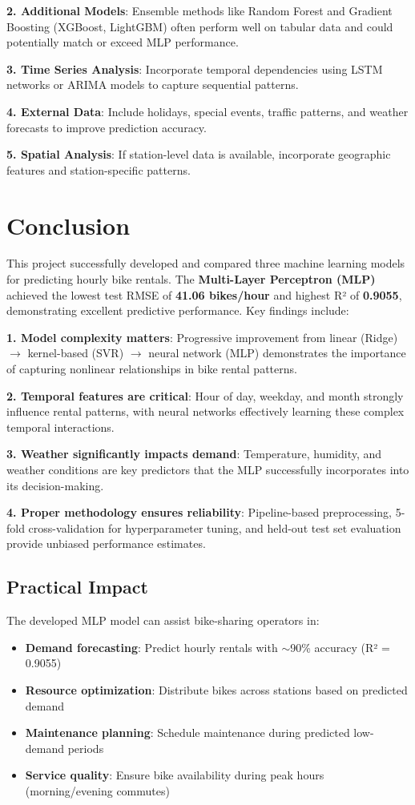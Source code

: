 \documentclass[conference]{IEEEtran}
\begin{document}
\textbf{2. Additional Models}: Ensemble methods like Random Forest and Gradient Boosting (XGBoost, LightGBM) often perform well on tabular data and could potentially match or exceed MLP performance.

\textbf{3. Time Series Analysis}: Incorporate temporal dependencies using LSTM networks or ARIMA models to capture sequential patterns.

\textbf{4. External Data}: Include holidays, special events, traffic patterns, and weather forecasts to improve prediction accuracy.

\textbf{5. Spatial Analysis}: If station-level data is available, incorporate geographic features and station-specific patterns.

\section{Conclusion}
\label{conclusion}

This project successfully developed and compared three machine learning models for predicting hourly bike rentals. The \textbf{Multi-Layer Perceptron (MLP)} achieved the lowest test RMSE of \textbf{41.06 bikes/hour} and highest R² of \textbf{0.9055}, demonstrating excellent predictive performance. Key findings include:

\textbf{1. Model complexity matters}: Progressive improvement from linear (Ridge) $\rightarrow$ kernel-based (SVR) $\rightarrow$ neural network (MLP) demonstrates the importance of capturing nonlinear relationships in bike rental patterns.

\textbf{2. Temporal features are critical}: Hour of day, weekday, and month strongly influence rental patterns, with neural networks effectively learning these complex temporal interactions.

\textbf{3. Weather significantly impacts demand}: Temperature, humidity, and weather conditions are key predictors that the MLP successfully incorporates into its decision-making.

\textbf{4. Proper methodology ensures reliability}: Pipeline-based preprocessing, 5-fold cross-validation for hyperparameter tuning, and held-out test set evaluation provide unbiased performance estimates.

\subsection{Practical Impact}

The developed MLP model can assist bike-sharing operators in:
\begin{itemize}
    \item \textbf{Demand forecasting}: Predict hourly rentals with $\sim$90\% accuracy (R² = 0.9055)
    \item \textbf{Resource optimization}: Distribute bikes across stations based on predicted demand
    \item \textbf{Maintenance planning}: Schedule maintenance during predicted low-demand periods
    \item \textbf{Service quality}: Ensure bike availability during peak hours (morning/evening commutes)
\end{itemize}
\end{document}
